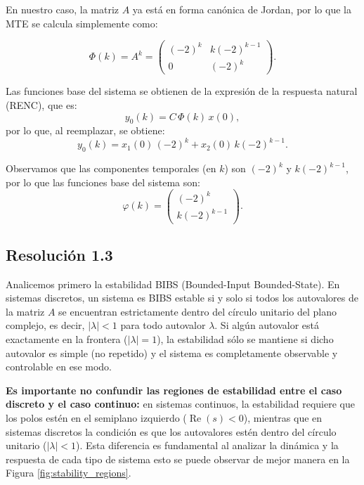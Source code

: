 \documentclass[
  11pt,
  letterpaper,
   addpoints,
  answers
  ]{exam}
\begin{document}
\begin{questions}
\begin{solution}
En nuestro caso, la matriz $A$ ya está en forma canónica de Jordan, por lo que la MTE se calcula simplemente como:

\begin{equation}
\Phi(k) = A^{k} =
\begin{pmatrix}
(-2)^{k} & k(-2)^{k-1} \\
0        & (-2)^{k}
\end{pmatrix}.
\end{equation}

Las funciones base del sistema se obtienen de la expresión de la respuesta natural (RENC), que es:
\begin{equation}
y_{0}(k) = C\,\Phi(k)\,x(0),
\end{equation}
por lo que, al reemplazar, se obtiene:
\begin{equation}
y_{0}(k) = x_{1}(0)\,(-2)^{k} + x_{2}(0)\,k(-2)^{k-1}.
\end{equation}

Observamos que las componentes temporales (en $k$) son $(-2)^{k}$ y $k(-2)^{k-1}$, por lo que las funciones base del sistema son:
\begin{equation}
\varphi(k) =
\begin{pmatrix}
(-2)^{k} \\
k(-2)^{k-1}
\end{pmatrix}.
\end{equation}

\subsection*{Resolución 1.3}


Analicemos primero la estabilidad BIBS (Bounded-Input Bounded-State). En sistemas discretos, un sistema es BIBS estable si y solo si todos los autovalores de la matriz $A$ se encuentran estrictamente dentro del círculo unitario del plano complejo, es decir, $|\lambda| < 1$ para todo autovalor $\lambda$. Si algún autovalor está exactamente en la frontera ($|\lambda| = 1$), la estabilidad sólo se mantiene si dicho autovalor es simple (no repetido) y el sistema es completamente observable y controlable en ese modo.

\textbf{Es importante no confundir las regiones de estabilidad entre el caso discreto y el caso continuo:} en sistemas continuos, la estabilidad requiere que los polos estén en el semiplano izquierdo ($\operatorname{Re}(s) < 0$), mientras que en sistemas discretos la condición es que los autovalores estén dentro del círculo unitario ($|\lambda| < 1$). Esta diferencia es fundamental al analizar la dinámica y la respuesta de cada tipo de sistema esto se puede observar de mejor manera en la Figura \ref{fig:stability_regions}.


\end{solution}
\end{questions}
\end{document}
